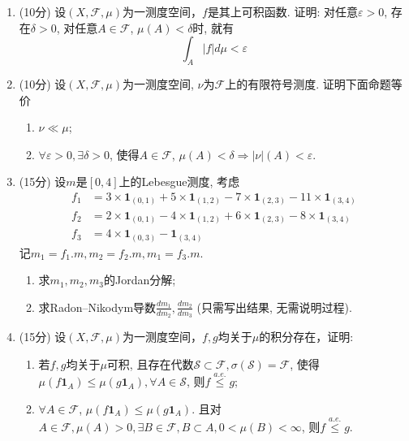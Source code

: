 \begin{enumerate}
  \item[五、] (10分)
  设$(X, \mathcal{F}, \mu)$为一测度空间，$f$是其上可积函数. 证明: 对任意$\varepsilon >0$, 
  存在$\delta >0$, 对任意$A \in \mathcal{F}$, $\mu(A)< \delta$时, 就有
  \begin{equation*}
   \int_{A} |f|d\mu < \varepsilon
  \end{equation*}

  \item[六、] (10分)
  设$(X ,\mathcal{F},\mu)$为一测度空间, $\nu$为$\mathcal{F}$上的有限符号测度. 证明下面命题等价
  \begin{enumerate}[label=(\arabic*)]
    \item $\nu \ll \mu$;
    \item $\forall \varepsilon >0, \exists \delta >0$, 使得$A \in \mathcal{F}$, $\mu(A)<\delta \Longrightarrow |\nu|(A)< \varepsilon $.
  \end{enumerate}

  \item[七、] (15分)
  设$m$是$[0,4]$上的Lebesgue测度, 考虑
\begin{align*}
    f_1 &=3\times\boldsymbol{1}_{(0,1)}+5 \times \boldsymbol{1}_{(1,2)}-7 \times \boldsymbol{1}_{(2,3)}-11\times \boldsymbol{1}_{(3,4)}\\
    f_2 &=2\times\boldsymbol{1}_{(0,1)}-4\times\boldsymbol{1}_{(1,2)}+6\times \boldsymbol{1}_{(2,3)}-8 \times \boldsymbol{1}_{(3,4)}\\
    f_3 &=4 \times \boldsymbol{1}_{(0,3)}-\boldsymbol{1}_{(3,4)}
\end{align*}
记$m_1= f_{1}.m, m_2= f_{2 }.m, m_1= f_{3}.m$.
\begin{enumerate}[label=(\arabic*)]
    \item 求$m_1, m_2 ,m_3$的Jordan分解;
    \item 求Radon--Nikodym导数$\frac{d m_1}{d m_2}, \frac{d m_2}{d m_3}$ (只需写出结果, 无需说明过程).
\end{enumerate}

 \item[八、] (15分)
 设$(X, \mathcal{F}, \mu)$为一测度空间，$f,g $均关于$\mu$的积分存在，证明:
 \begin{enumerate}[label=(\arabic*)]
    \item 若$f,g$均关于$\mu$可积, 且存在代数$\mathcal{S} \subset \mathcal{F}, \sigma(\mathcal{S})=\mathcal{F}$, 使得
    $\mu(f \boldsymbol{1}_{A}) \leq \mu(g \boldsymbol{1}_{A}), \forall A \in \mathcal{S}$, 则$f \overset{a.e.}{\leq} g$;
    \item $\forall A \in \mathcal{F}$, $\mu(f \boldsymbol{1}_{A}) \leq \mu(g \boldsymbol{1}_{A})$. 
   且对$A \in \mathcal{F}, \mu(A)>0, \exists B \in \mathcal{F}, B \subset A, 0<\mu(B)<\infty$, 则$f \overset{a.e.}{\leq} g$.
 \end{enumerate}
\end{enumerate}

